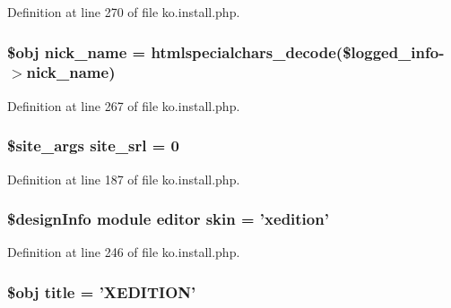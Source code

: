 Definition at line 270 of file ko.\-install.\-php.

\hypertarget{ko_8install_8php_a151ecae87a1f3d7e257aa089803086bd}{
\subsubsection[{nick\-\_\-name}]{\setlength{\rightskip}{0pt plus 5cm}\$obj nick\-\_\-name = htmlspecialchars\-\_\-decode(\$logged\-\_\-info-\/$>$nick\-\_\-name)}}\label{ko_8install_8php_a151ecae87a1f3d7e257aa089803086bd}


Definition at line 267 of file ko.\-install.\-php.

\hypertarget{ko_8install_8php_a8b1406b4ad1048041558dce6bfe89004}{
\subsubsection[{site\-\_\-srl}]{\setlength{\rightskip}{0pt plus 5cm}\$site\-\_\-args site\-\_\-srl = 0}}\label{ko_8install_8php_a8b1406b4ad1048041558dce6bfe89004}


Definition at line 187 of file ko.\-install.\-php.

\hypertarget{ko_8install_8php_ab0f2b49fdb57754496b34f6b880cdeaf}{
\subsubsection[{skin}]{\setlength{\rightskip}{0pt plus 5cm}\$design\-Info {\bf module} {\bf editor} skin = 'xedition'}}\label{ko_8install_8php_ab0f2b49fdb57754496b34f6b880cdeaf}


Definition at line 246 of file ko.\-install.\-php.

\hypertarget{ko_8install_8php_a5b072c5fd1d2228c6ba5cee13cd142e3}{
\subsubsection[{title}]{\setlength{\rightskip}{0pt plus 5cm}\$obj title = 'X\-E\-D\-I\-T\-I\-O\-N'}}\label{ko_8install_8php_a5b072c5fd1d2228c6ba5cee13cd142e3}


